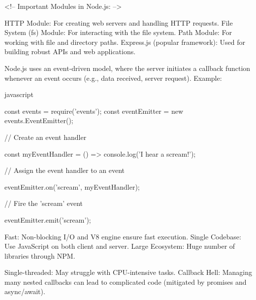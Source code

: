 <!-- Important Modules in Node.js: -->


{HTTP Module: }            For creating web servers and handling HTTP requests.
File System (fs) Module:   For interacting with the file system.
{Path Module: }            For working with file and directory paths.
{Express.js (popular framework):}  Used for building robust APIs and web applications.




Node.js uses an event-driven model, where the server initiates a callback function whenever an event occurs (e.g., data received, server request).
Example:

javascript


const events = require('events');
const eventEmitter = new events.EventEmitter();

// Create an event handler


const myEventHandler = () => {
    console.log('I hear a scream!');
}

// Assign the event handler to an event

eventEmitter.on('scream', myEventHandler);

// Fire the 'scream' event


eventEmitter.emit('scream');


Fast: Non-blocking I/O and V8 engine ensure fast execution.
Single Codebase: Use JavaScript on both client and server.
Large Ecosystem: Huge number of libraries through NPM.




Single-threaded: May struggle with CPU-intensive tasks.
Callback Hell: Managing many nested callbacks can lead to complicated code (mitigated by promises and async/await).